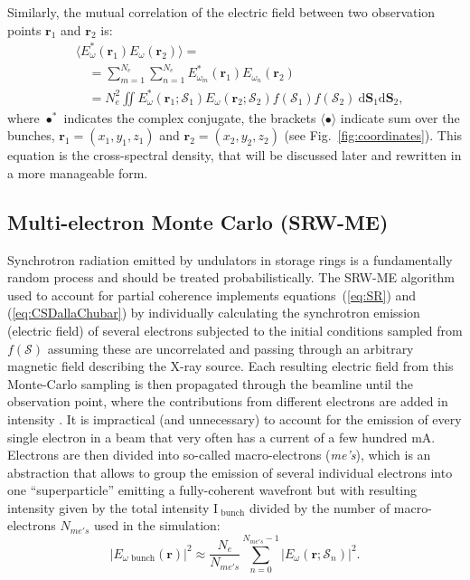 \documentclass[preprint]{iucr}
\newcommand{\inred}[1]{{\color{red}#1}}
\begin{document}
\inred{Similarly}, the mutual correlation of the electric field between two observation points $\textbf{r}_1$ and $\textbf{r}_2$ is:
\begin{equation}\label{eq:CSDallaChubar}
\begin{split}
      &\big\langle E^*_{\omega}(\textbf{r}_1) E_{\omega}(\textbf{r}_2)\big\rangle = \\
      &\quad = \sum_{m=1}^{N_e} \sum_{n=1}^{N_e} E^*_{\omega_{m}}(\textbf{r}_1) E_{\omega_{n}}(\textbf{r}_2)\\
      &\quad = N_e^2\iint
      E^*_{\omega}(\textbf{r}_1;\mathcal{S}_1)
      E_{\omega}(\textbf{r}_2;\mathcal{S}_2)
      f(\mathcal{S}_1) f(\mathcal{S}_2)~
      \text{d}\textbf{S}_1 \text{d}\textbf{S}_2,
\end{split}
\end{equation}
where $\bullet^*$ indicates the complex conjugate, the brackets $\langle \bullet \rangle$ indicate sum over the bunches, $\textbf{r}_1=(x_1,y_1,z_1)$ and $\textbf{r}_2=(x_2,y_2,z_2)$ (see Fig.~\ref{fig:coordinates}). This equation is the cross-spectral density, that will be discussed later and rewritten in \inred{a} more manageable form.

\subsection{Multi-electron Monte Carlo (SRW-ME)}

Synchrotron radiation emitted by undulators in storage rings is a fundamentally random process and should be treated probabilistically. The SRW-ME algorithm used to account for partial coherence implements equations~(\ref{eq:SR}) and (\ref{eq:CSDallaChubar}) by individually calculating the synchrotron emission (electric field) of several electrons subjected to the initial conditions sampled from $f(\mathcal{S})$ assuming these are uncorrelated and passing through an arbitrary magnetic field describing the X-ray source. Each resulting electric field from this Monte-Carlo sampling is then propagated through the beamline until the observation point, where the contributions from different electrons are added in intensity \cite{codeSRW_ME}. It is impractical (and unnecessary) to account for the emission of every single electron in a beam that very often has a current of \inred{a} few hundred mA. Electrons are then divided \inred{into} so-called macro-electrons (\textit{me's}), which is an abstraction that allows to group the emission of several individual electrons into one ``superparticle'' emitting a fully-coherent wavefront but with resulting intensity given by the total intensity $\text{I}_\text{~bunch}$ divided by the number of macro-electrons $N_{me's}$ used in the simulation:
\begin{equation}
|E_{\omega\text{~bunch}}(\textbf{r})|^2 \approx \frac{N_e}{N_{me's}}\sum_{n=0}^{N_{me's} - 1}\big| E_\omega(\textbf{r};\mathcal{S}_n)\big|^2.
\label{eq:SR_SRW}
\end{equation}
\end{document}
